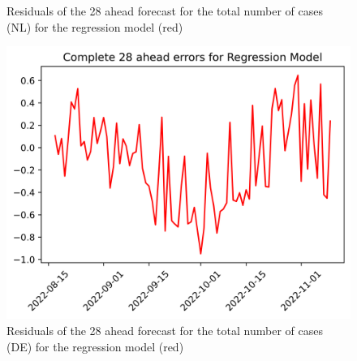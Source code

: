 \begin{figure}
\begin{minipage}{.32\textwidth}
  \caption{Residuals of the 28 ahead forecast for the total number of cases (NL) for the regression model (red)}
  \label{fig:tot_cases_error_28_RM}
\end{minipage}
\begin{minipage}{.32\textwidth}
  \centering
  \includegraphics[width=\linewidth]{pics/28_ah/DE_28_ahead_errors_Regression Model.png}
  \caption{Residuals of the 28 ahead forecast for the total number of cases (DE) for the regression model (red)}
  \label{fig:tot_cases_error_28_RM_DE}
\end{minipage}

\end{figure}
